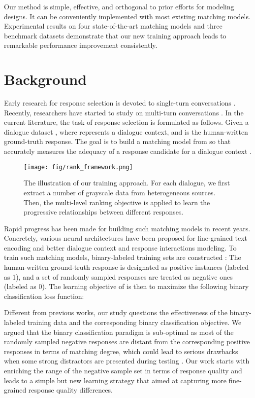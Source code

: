 \documentclass[11pt,a4paper]{article}
\begin{document}
	Our method is simple, effective, and orthogonal to prior efforts for modeling designs. It can be conveniently implemented with most existing matching models. Experimental results on four state-of-the-art matching models and three benchmark datasets demonstrate that our new training approach leads to remarkable performance improvement consistently.
	\section{Background}
	\label{sec:Problem}
	Early research for response selection is devoted to single-turn conversations \cite{wang2013dataset,tan2015lstm,yan2016learning}. Recently, researchers have started to study on multi-turn conversations \cite{lowe2015ubuntu,wu2017sequential,zhang2018modeling}. In the current literature, the task of response selection is formulated as follows. Given a dialogue dataset , where  represents a dialogue context, and  is the human-written ground-truth response. The goal is to build a matching model  from  so that  accurately measures the adequacy of a response candidate  for a dialogue context .
	\begin{figure*}[t]
		\centering
		\texttt{[image: fig/rank\_framework.png]}
		\caption{The illustration of our training approach. For each dialogue, we first extract a number of grayscale data from heterogeneous sources. Then, the multi-level ranking objective is applied to learn the progressive relationships between different responses.}
		\label{framework_pic}
	\end{figure*}
	
	Rapid progress has been made for building such matching models in recent years. Concretely, various neural architectures \cite{zhou2016multi,wu2017sequential,zhou2018multi,gu2019interactive,tao2019one,yuan2019multi} have been proposed for fine-grained
	text encoding and better dialogue context and response interactions modeling. To train such matching models, binary-labeled training sets are constructed \cite{lowe2015ubuntu,wu2017sequential,zhang2018modeling}: The human-written ground-truth response is designated as positive instances (labeled as 1), and a set of randomly sampled responses  are treated as negative ones (labeled as 0). The learning objective of  is then to maximize the following binary classification loss function:
	
	
	Different from previous works, our study questions the effectiveness of the binary-labeled training data and the corresponding binary classification objective. We argued that the binary classification paradigm is sub-optimal as most of the randomly sampled negative responses are distant from the corresponding positive responses in terms of matching degree, which could lead to serious drawbacks when some strong distractors are presented during testing \cite{zhou2018multi,zhang2018modeling}. Our work starts with enriching the range of the negative sample set  in terms of response quality and leads to a simple but new learning strategy that aimed at capturing more fine-grained response quality differences.
\end{document}
